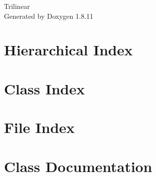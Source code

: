\documentclass[twoside]{book}
\newcommand{\+}{\discretionary{\mbox{\scriptsize$\hookleftarrow$}}{}{}}
\newcommand{\clearemptydoublepage}{%
  \newpage{\pagestyle{empty}\cleardoublepage}%
}
\begin{document}
\hypersetup{pageanchor=false,
             bookmarksnumbered=true,
             pdfencoding=unicode
            }
\begin{titlepage}
\vspace*{7cm}
\begin{center}%
{\Large Trilinear }\\
\vspace*{1cm}
{\large Generated by Doxygen 1.8.11}\\
\end{center}
\end{titlepage}
\clearemptydoublepage
\tableofcontents
\clearemptydoublepage
{}
\hypersetup{pageanchor=true}

\chapter{Hierarchical Index}

\chapter{Class Index}

\chapter{File Index}

\chapter{Class Documentation}



































\end{document}

